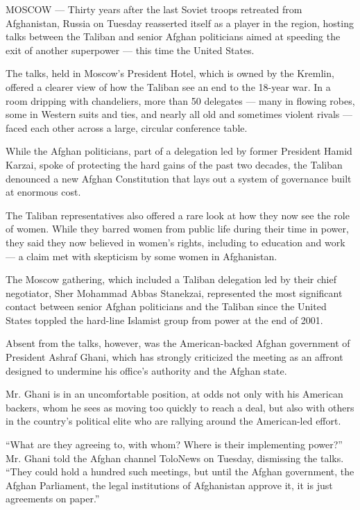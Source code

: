 MOSCOW --- Thirty years after the last Soviet troops retreated from
Afghanistan, Russia on Tuesday reasserted itself as a player in the
region, hosting talks between the Taliban and senior Afghan politicians
aimed at speeding the exit of another superpower --- this time the
United States.

The talks, held in Moscow's President Hotel, which is owned by the
Kremlin, offered a clearer view of how the Taliban see an end to the
18-year war. In a room dripping with chandeliers, more than 50 delegates
--- many in flowing robes, some in Western suits and ties, and nearly
all old and sometimes violent rivals --- faced each other across a
large, circular conference table.

While the Afghan politicians, part of a delegation led by former
President Hamid Karzai, spoke of protecting the hard gains of the past
two decades, the Taliban denounced a new Afghan Constitution that lays
out a system of governance built at enormous cost.

The Taliban representatives also offered a rare look at how they now see
the role of women. While they barred women from public life during their
time in power, they said they now believed in women's rights, including
to education and work --- a claim met with skepticism by some women in
Afghanistan.

The Moscow gathering, which included a Taliban delegation led by their
chief negotiator, Sher Mohammad Abbas Stanekzai, represented the most
significant contact between senior Afghan politicians and the Taliban
since the United States toppled the hard-line Islamist group from power
at the end of 2001.

Absent from the talks, however, was the American-backed Afghan
government of President Ashraf Ghani, which has strongly criticized the
meeting as an affront designed to undermine his office's authority and
the Afghan state.

Mr. Ghani is in an uncomfortable position, at odds not only with his
American backers, whom he sees as moving too quickly to reach a deal,
but also with others in the country's political elite who are rallying
around the American-led effort.

``What are they agreeing to, with whom? Where is their implementing
power?'' Mr. Ghani told the Afghan channel ToloNews on Tuesday,
dismissing the talks. ``They could hold a hundred such meetings, but
until the Afghan government, the Afghan Parliament, the legal
institutions of Afghanistan approve it, it is just agreements on
paper.''

